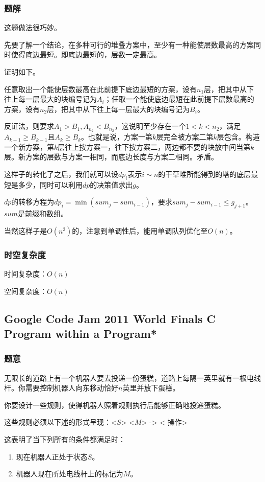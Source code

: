 \documentclass{ctexart}
\begin{document}
\subsubsection{题解}
这题做法很巧妙。

先要了解一个结论，在多种可行的堆叠方案中，至少有一种能使层数最高的方案同时使得底边最短。即底边最短的，层数一定最高。

证明如下。

任意取出一个能使层数最高在此前提下底边最短的方案，设有$n_1$层，把其中从下往上每一层最大的块编号记为$A_i$；任取一个能使底边最短在此前提下层数最高的方案，设有$n_2$层，把其中从下往上每一层最大的块编号记为$B_i$。

反证法，则要求$A_1 > B_1,A_{n_2} < B_{n_2}$，这说明至少存在一个$1<k<n_2$，满足$A_{k-1} \ge B_{k-1}$且$A_k \ge B_k$。也就是说，方案一第$k$层完全被方案二第$k$层包含。构造一个新方案，第$k$层往上按方案一，往下按方案二，两边都不要的块放中间当第$k$层。新方案的层数与方案一相同，而底边长度与方案二相同。矛盾。

这样子的转化了之后，我们就可以设$dp_i$表示$i \sim n$的干草堆所能得到的塔的底层最短是多少，同时可以利用$dp$的决策值求出$g$。

$dp$的转移方程为$dp_i=\min(sum_j-sum_{i-1})$，要求$sum_j-sum_{i-1} \le g_{j+1}$。$sum$是前缀和数组。

当然这样子是$O(n^2)$的，注意到单调性后，能用单调队列优化至$O(n)$。
\subsubsection{时空复杂度}
时间复杂度：$O(n)$

空间复杂度：$O(n)$
\subsection{Google Code Jam 2011 World Finals C Program within a Program*}
\subsubsection{题意}
无限长的道路上有一个机器人要去投递一份蛋糕，道路上每隔一英里就有一根电线杆。你需要控制机器人向东移动恰好$n$英里并放下蛋糕。

你要设计一些规则，使得机器人照着规则执行后能够正确地投递蛋糕。

这些规则必须以下述的形式呈现：<$S$> <$M$> -> < 操作>

这表明了当下列所有的条件都满足时：

\begin{enumerate}
\item 现在机器人正处于状态$S$。
\item 机器人现在所处电线杆上的标记为$M$。
\end{enumerate}
\end{document}
